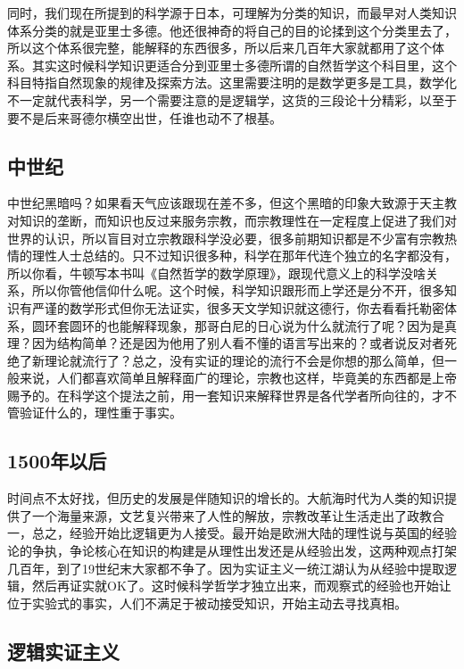 \documentclass[]{book}
\begin{document}
同时，我们现在所提到的科学源于日本，可理解为分类的知识，而最早对人类知识体系分类的就是亚里士多德。他还很神奇的将自己的目的论揉到这个分类里去了，所以这个体系很完整，能解释的东西很多，所以后来几百年大家就都用了这个体系。其实这时候科学知识更适合分到亚里士多德所谓的自然哲学这个科目里，这个科目特指自然现象的规律及探索方法。这里需要注明的是数学更多是工具，数学化不一定就代表科学，另一个需要注意的是逻辑学，这货的三段论十分精彩，以至于要不是后来哥德尔横空出世，任谁也动不了根基。

\subsection{中世纪}

中世纪黑暗吗？如果看天气应该跟现在差不多，但这个黑暗的印象大致源于天主教对知识的垄断，而知识也反过来服务宗教，而宗教理性在一定程度上促进了我们对世界的认识，所以盲目对立宗教跟科学没必要，很多前期知识都是不少富有宗教热情的理性人士总结的。只不过知识很多种，科学在那年代连个独立的名字都没有，所以你看，牛顿写本书叫《自然哲学的数学原理》，跟现代意义上的科学没啥关系，所以你管他信仰什么呢。这个时候，科学知识跟形而上学还是分不开，很多知识有严谨的数学形式但你无法证实，很多天文学知识就这德行，你去看看托勒密体系，圆环套圆环的也能解释现象，那哥白尼的日心说为什么就流行了呢？因为是真理？因为结构简单？还是因为他用了别人看不懂的语言写出来的？或者说反对者死绝了新理论就流行了？总之，没有实证的理论的流行不会是你想的那么简单，但一般来说，人们都喜欢简单且解释面广的理论，宗教也这样，毕竟美的东西都是上帝赐予的。在科学这个提法之前，用一套知识来解释世界是各代学者所向往的，才不管验证什么的，理性重于事实。

\subsection{1500年以后}

时间点不太好找，但历史的发展是伴随知识的增长的。大航海时代为人类的知识提供了一个海量来源，文艺复兴带来了人性的解放，宗教改革让生活走出了政教合一，总之，经验开始比逻辑更为人接受。最开始是欧洲大陆的理性说与英国的经验论的争执，争论核心在知识的构建是从理性出发还是从经验出发，这两种观点打架几百年，到了19世纪末大家都不争了。因为实证主义一统江湖认为从经验中提取逻辑，然后再证实就OK了。这时候科学哲学才独立出来，而观察式的经验也开始让位于实验式的事实，人们不满足于被动接受知识，开始主动去寻找真相。

\subsection{逻辑实证主义}
\end{document}
